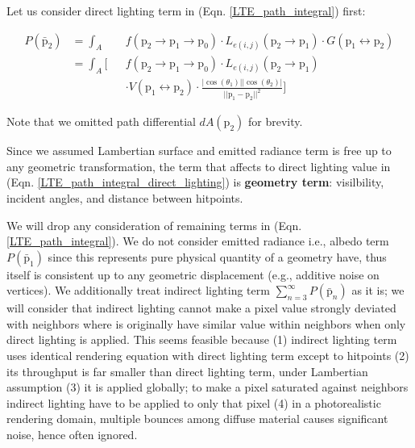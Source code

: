 Let us consider direct lighting term in (Eqn. \ref{LTE_path_integral}) first:

\begin{align}
    \mathit{P}\left(\bar{\mathrm{p}}_2\right) & = \int_A && f\left(\mathrm{p}_2\rightarrow \mathrm{p}_1 \rightarrow \mathrm{p}_0\right)\cdot L_{e(i,j)}\left(\mathrm{p}_2\rightarrow \mathrm{p}_1\right) \cdot G\left(\mathrm{p}_1 \leftrightarrow \mathrm{p}_2\right) \nonumber \\
    & = \int_A \Bigg[ && f\left(\mathrm{p}_2\rightarrow \mathrm{p}_1 \rightarrow \mathrm{p}_0\right)\cdot L_{e(i,j)}(\mathrm{p}_2\rightarrow \mathrm{p}_1) \nonumber \\ 
    & && \cdot V(\mathrm{p}_1 \leftrightarrow \mathrm{p}_2) \cdot \frac{|\cos(\theta_1)| |\cos(\theta_2)|}{||\mathrm{p}_1-\mathrm{p}_2||^2}\Bigg]
    \label{LTE_path_integral_direct_lighting}
\end{align}

Note that we omitted path differential $dA(\mathrm{p}_2)$ for brevity.

Since we assumed Lambertian surface and emitted radiance term is free up to any geometric transformation, the term that affects to direct lighting value in (Eqn. \ref{LTE_path_integral_direct_lighting}) is \textbf{geometry term}: visilbility, incident angles, and distance between hitpoints.

We will drop any consideration of remaining terms in (Eqn. \ref{LTE_path_integral}). We do not consider emitted radiance i.e., albedo term $\mathit{P}\left(\bar{\mathrm{p}}_1\right)$ since this represents pure physical quantity of a geometry have, thus itself is consistent up to any geometric displacement (e.g., additive noise on vertices).
We additionally treat indirect lighting term $\sum_{n=3}^\infty \mathit{P}(\bar{\mathrm{p}}_n)$ as it is; we will consider that indirect lighting cannot make a pixel value strongly deviated with neighbors where is originally have similar value within neighbors when only direct lighting is applied. 
This seems feasible because (1) indirect lighting term uses identical rendering equation with direct lighting term except to hitpoints (2) its throughput is far smaller than direct lighting term, under Lambertian assumption (3) it is applied globally; to make a pixel saturated against neighbors indirect lighting have to be applied to only that pixel (4) in a photorealistic rendering domain, multiple bounces among diffuse material causes significant noise, hence often ignored\cite{moon2013robust}.

